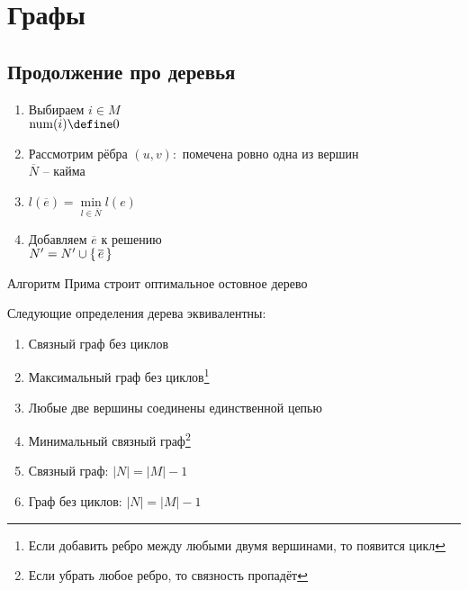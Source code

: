 \chapter{Графы}

\section{Продолжение про деревья}

\begin{algorithm}[Прима]
	\hfill
    \begin{enumerate}
    	\item Выбираем $ i \in M $ \\
        $ \operatorname{num}(i) \define 0 $
        \item Рассмотрим рёбра $ (u, v) : $ помечена ровно одна из вершин \\
        $ \overline{N} $ -- кайма
        \item $ l(\overline{e}) = \min\limits_{l \in \overline{N}} l(e) $
        \item Добавляем $ \overline{e} $ к решению \\
        $ N' = N' \cup \set{\overline{e}} $
    \end{enumerate}
\end{algorithm}

\begin{theorem}
	Алгоритм Прима строит оптимальное остовное дерево
\end{theorem}

\begin{theorem}
	Следующие определения дерева эквивалентны:
    \begin{enumerate}
        \item \label{it:1} Связный граф без циклов
        \item \label{it:2} Максимальный граф без циклов\footnote{Если добавить ребро между любыми двумя вершинами, то появится цикл}
        \item \label{it:3} Любые две вершины соединены единственной цепью
        \item \label{it:4} Минимальный связный граф\footnote{Если убрать любое ребро, то связность пропадёт}
        \item \label{it:5} Связный граф: $ |N| = |M| - 1 $
        \item \label{it:6} Граф без циклов: $ |N| = |M| - 1 $
    \end{enumerate}
\end{theorem}

